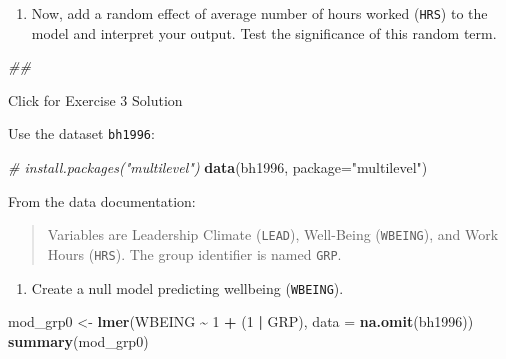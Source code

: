 \documentclass[
]{book}
\newenvironment{Shaded}{\begin{snugshade}}{\end{snugshade}}
\newcommand{\CommentTok}[1]{\textcolor[rgb]{0.56,0.35,0.01}{\textit{#1}}}
\newcommand{\DataTypeTok}[1]{\textcolor[rgb]{0.13,0.29,0.53}{#1}}
\newcommand{\DecValTok}[1]{\textcolor[rgb]{0.00,0.00,0.81}{#1}}
\newcommand{\KeywordTok}[1]{\textcolor[rgb]{0.13,0.29,0.53}{\textbf{#1}}}
\newcommand{\NormalTok}[1]{#1}
\newcommand{\OperatorTok}[1]{\textcolor[rgb]{0.81,0.36,0.00}{\textbf{#1}}}
\newcommand{\StringTok}[1]{\textcolor[rgb]{0.31,0.60,0.02}{#1}}
\providecommand{\tightlist}{%
  \setlength{\itemsep}{0pt}\setlength{\parskip}{0pt}}
\begin{document}
\begin{enumerate}
\def\labelenumi{\arabic{enumi}.}
\setcounter{enumi}{3}
\tightlist
\item
  Now, add a random effect of average number of hours worked (\texttt{HRS}) to the model and interpret your output. Test the significance of this random term.
\end{enumerate}

\begin{Shaded}
\begin{Highlighting}[]
\CommentTok{\#\# }
\end{Highlighting}
\end{Shaded}

{Click for Exercise 3 Solution}

\begin{alert}

Use the dataset \texttt{bh1996}:

\begin{Shaded}
\begin{Highlighting}[]
  \CommentTok{\# install.packages("multilevel")}
  \KeywordTok{data}\NormalTok{(bh1996, }\DataTypeTok{package=}\StringTok{"multilevel"}\NormalTok{)}
\end{Highlighting}
\end{Shaded}

From the data documentation:

\begin{quote}
Variables are Leadership Climate (\texttt{LEAD}), Well-Being (\texttt{WBEING}), and Work Hours (\texttt{HRS}). The group identifier is named \texttt{GRP}.
\end{quote}

\begin{enumerate}
\def\labelenumi{\arabic{enumi}.}
\tightlist
\item
  Create a null model predicting wellbeing (\texttt{WBEING}).
\end{enumerate}

\begin{Shaded}
\begin{Highlighting}[]
\NormalTok{  mod\_grp0 \textless{}{-}}\StringTok{ }\KeywordTok{lmer}\NormalTok{(WBEING }\OperatorTok{\textasciitilde{}}\StringTok{ }\DecValTok{1} \OperatorTok{+}\StringTok{ }\NormalTok{(}\DecValTok{1} \OperatorTok{|}\StringTok{ }\NormalTok{GRP), }\DataTypeTok{data =} \KeywordTok{na.omit}\NormalTok{(bh1996))}
  \KeywordTok{summary}\NormalTok{(mod\_grp0)}
\end{Highlighting}
\end{Shaded}


\end{alert}
\end{document}

